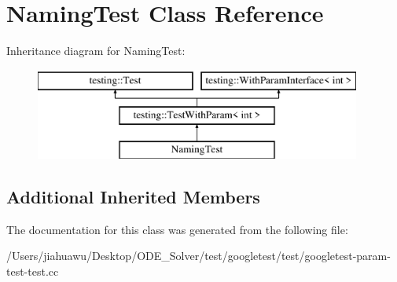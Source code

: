 \hypertarget{class_naming_test}{}\section{Naming\+Test Class Reference}
\label{class_naming_test}
Inheritance diagram for Naming\+Test\+:\begin{figure}[H]
\begin{center}
\leavevmode
\includegraphics[height=3.000000cm]{class_naming_test}
\end{center}
\end{figure}
\subsection*{Additional Inherited Members}


The documentation for this class was generated from the following file\+:\begin{DoxyCompactItemize}
\item 
/\+Users/jiahuawu/\+Desktop/\+O\+D\+E\+\_\+\+Solver/test/googletest/test/googletest-\/param-\/test-\/test.\+cc\end{DoxyCompactItemize}
